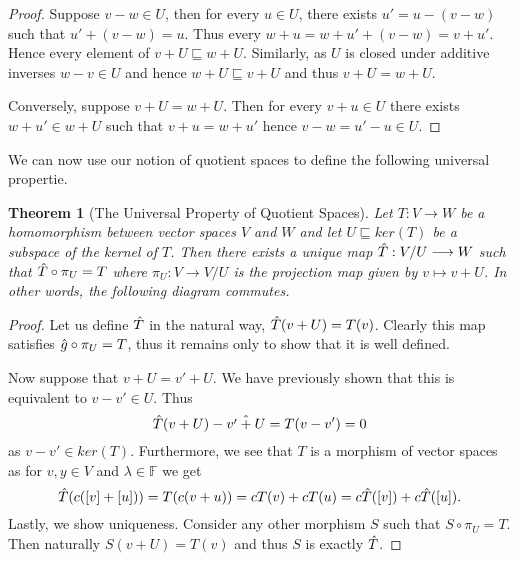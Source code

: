 \documentclass[12pt]{extarticle}
\newtheorem*{theorem}{Theorem}
\renewcommand{\mapsto}[0]{\longmapsto}
\renewcommand{\to}[0]{\longrightarrow}
\newcommand{\F}{{\mathbb{F}}}
\begin{document}
\begin{proof}
  Suppose $v - w \in U$, then for every $u \in U$, there exists $u' = u - (v - w)$ such that $u' + (v - w) = u$. Thus every $w + u = w + u' + (v - w) = v + u'$. Hence every element of $v + U \sqsubseteq w + U$. Similarly, as $U$ is closed under additive inverses $w - v \in U$ and hence $w + U \sqsubseteq v + U$ and thus $v + U = w + U$.
  
  Conversely, suppose $v + U = w + U$. Then for every $v + u \in U$ there exists $w + u' \in w + U$ such that $v + u = w + u'$ hence $v - w = u' - u \in U$.
\end{proof}

We can now use our notion of quotient spaces to define the following universal propertie.

\begin{theorem}[The Universal Property of Quotient Spaces]
  Let $T : V \to W$ be a homomorphism between vector spaces $V$ and $W$ and let $U \sqsubseteq ker(T)$ be a subspace of the kernel of $T$. Then there exists a unique map $\Hat{T} : V / U \to W$ such that $\Hat{T} \circ \pi_U = T$ where $\pi_U : V \to V / U$ is the projection map given by $v \mapsto v + U$. In other words, the following diagram commutes. 
  
  \begin{center}
  \end{center}
\end{theorem}

\begin{proof} 

Let us define $\Hat{T}$ in the natural way, $\Hat{T}(v + U) = T(v)$. Clearly this map satisfies $\Hat{g} \circ \pi_U = T$, thus it remains only to show that it is well defined. 

Now suppose that $v + U = v' + U$. We have previously shown that this is equivalent to $v - v' \in U$. Thus 
\[
  \Hat{T}(v + U) - \Hat{v' + U} = T(v - v') = 0
\]
as $v - v' \in ker(T)$. Furthermore, we see that $T$ is a morphism of vector spaces as for $v, y \in V$ and $\lambda \in \F$ we get 
\[
  \Hat{T}(c([v] + [u])) = T(c(v + u)) = cT(v) + cT(u) = c\Hat{T}([v]) + c\Hat{T}([u]).
\]
Lastly, we show uniqueness. Consider any other morphism $S$ such that $S \circ \pi_U = T$. Then naturally $S(v + U) = T(v)$ and thus $S$ is exactly $\Hat{T}$.
\end{proof}
\end{document}
